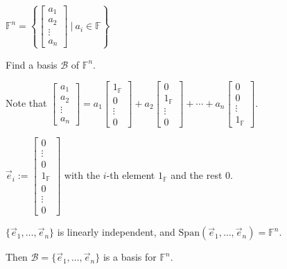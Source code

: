 \documentclass[11pt,fleqn]{book} %
\begin{document}
\begin{example}
{~~~}

    $\mathbb{F}^n = \left\{ \begin{bmatrix} a_1\\a_2\\\vdots\\a_n \end{bmatrix} ~|~a_i \in \mathbb{F} \right\}$

    Find a basis $\mathcal{B}$ of $\mathbb{F}^n$.

    Note that $\begin{bmatrix} a_1\\a_2\\\vdots\\a_n \end{bmatrix} = a_1\begin{bmatrix}1_{\mathbb{F}}\\0\\\vdots\\0 \end{bmatrix} + a_2\begin{bmatrix} 0\\1_{\mathbb{F}}\\\vdots\\0 \end{bmatrix} + \cdots + a_n\begin{bmatrix} 0\\0\\\vdots\\1_{\mathbb{F}} \end{bmatrix}$.

    $\vec{e}_i := \begin{bmatrix} 0\\\vdots\\0\\1_{\mathbb{F}}\\0\\\vdots\\0 \end{bmatrix}$ with the $i$-th element $1_\mathbb{F}$ and the rest $0$.

    $\{\vec{e}_1, \dots, \vec{e}_n\}$ is linearly independent, and $\mathrm{Span}\left( \vec{e}_1, \dots, \vec{e}_n \right) = \mathbb{F}^n$.

    Then $\mathcal{B} = \{\vec{e}_1, \dots, \vec{e}_n\} $ is a basis for $\mathbb{F}^n$.
\end{example}
\end{document}
